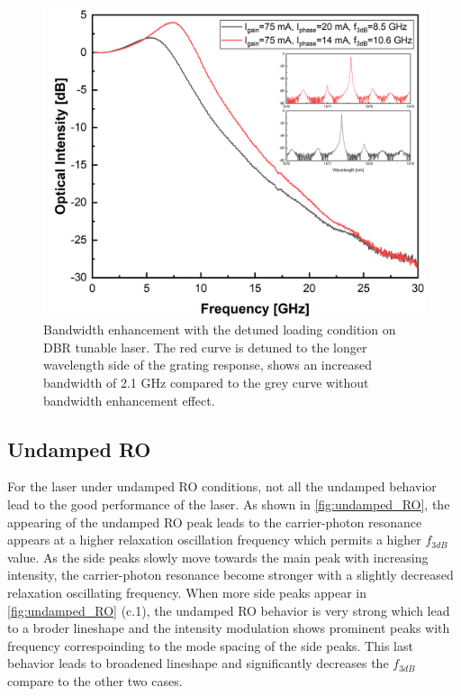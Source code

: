 \begin{figure}[ht]
    \centering
    \includegraphics[width=.6\linewidth]{figures/detuned_loading.png}
    \caption{Bandwidth enhancement with the detuned loading condition on DBR tunable laser. The red curve is detuned to the longer wavelength side of the grating response, shows an increased bandwidth of 2.1 GHz compared to the grey curve without bandwidth enhancement effect.}
    \label{fig:detuned_loading}
\end{figure}

\subsection{Undamped RO}\label{subsec:undamped_RO_measurement}
For the laser under undamped RO conditions, not all the undamped behavior lead to the good performance of the laser. As shown in \autoref{fig:undamped_RO}, the appearing of the undamped RO peak leads to the carrier-photon resonance appears at a higher relaxation oscillation frequency which permits a higher $f_{3dB}$ value. As the side peaks slowly move towards the main peak with increasing intensity, the carrier-photon resonance become stronger with a slightly decreased relaxation oscillating frequency. When more side peaks appear in \autoref{fig:undamped_RO} (c.1), the undamped RO behavior is very strong which lead to a broder lineshape and the intensity modulation shows prominent peaks with frequency correspoinding to the mode spacing of the side peaks. This last behavior leads to broadened lineshape and significantly decreases the $f_{3dB}$ compare to the other two cases.

